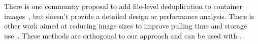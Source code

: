 There is one community proposal to add file-level deduplication to container
images~\cite{Krohmer-proposal}, but doesn't provide a detailed design or performance
analysis.
%
There is other work aimed at reducing image sizes to improve pulling time and 
storage use~\cite{cntr,rastogi2017cimplifier,gschwind2017optimizing,dockerslim}. 
%
These methods are orthogonal to our approach and can be used  with \sysname.
%
%
%
%
%
%
%
%
%

